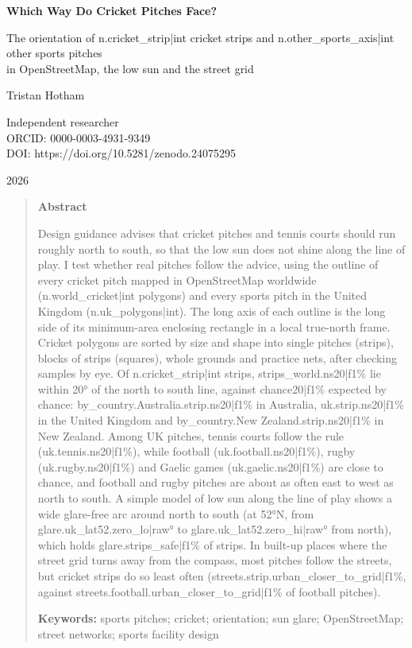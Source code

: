 \documentclass[11pt,a4paper]{article}
\begin{document}
\begin{center}
{\Large\bfseries Which Way Do Cricket Pitches Face?\par}
\vspace{0.4em}
{\large The orientation of {{n.cricket_strip|int}} cricket strips and {{n.other_sports_axis|int}} other sports pitches\\in OpenStreetMap, the low sun and the street grid\par}
\vspace{1.2em}
{\large Tristan Hotham\par}
\vspace{0.3em}
{\small Independent researcher\\
ORCID: 0000-0003-4931-9349\\
DOI: https://doi.org/10.5281/zenodo.24075295\par}
\vspace{0.8em}
2026
\end{center}

\begin{quote}
\small
\begin{center}\textbf{Abstract}\end{center}
Design guidance advises that cricket pitches and tennis courts should run roughly north to south, so that the low sun does not shine along the line of play. I test whether real pitches follow the advice, using the outline of every cricket pitch mapped in OpenStreetMap worldwide ({{n.world_cricket|int}} polygons) and every sports pitch in the United Kingdom ({{n.uk_polygons|int}}). The long axis of each outline is the long side of its minimum-area enclosing rectangle in a local true-north frame. Cricket polygons are sorted by size and shape into single pitches (strips), blocks of strips (squares), whole grounds and practice nets, after checking samples by eye. Of {{n.cricket_strip|int}} strips, {{strips_world.ns20|f1}}\% lie within 20° of the north to south line, against {{chance20|f1}}\% expected by chance: {{by_country.Australia.strip.ns20|f1}}\% in Australia, {{uk.strip.ns20|f1}}\% in the United Kingdom and {{by_country.New Zealand.strip.ns20|f1}}\% in New Zealand. Among UK pitches, tennis courts follow the rule ({{uk.tennis.ns20|f1}}\%), while football ({{uk.football.ns20|f1}}\%), rugby ({{uk.rugby.ns20|f1}}\%) and Gaelic games ({{uk.gaelic.ns20|f1}}\%) are close to chance, and football and rugby pitches are about as often east to west as north to south. A simple model of low sun along the line of play shows a wide glare-free arc around north to south (at 52°N, from {{glare.uk_lat52.zero_lo|raw}}° to {{glare.uk_lat52.zero_hi|raw}}° from north), which holds {{glare.strips_safe|f1}}\% of strips. In built-up places where the street grid turns away from the compass, most pitches follow the streets, but cricket strips do so least often ({{streets.strip.urban_closer_to_grid|f1}}\%, against {{streets.football.urban_closer_to_grid|f1}}\% of football pitches).

\textbf{Keywords:} sports pitches; cricket; orientation; sun glare; OpenStreetMap; street networks; sports facility design
\end{quote}
\end{document}

